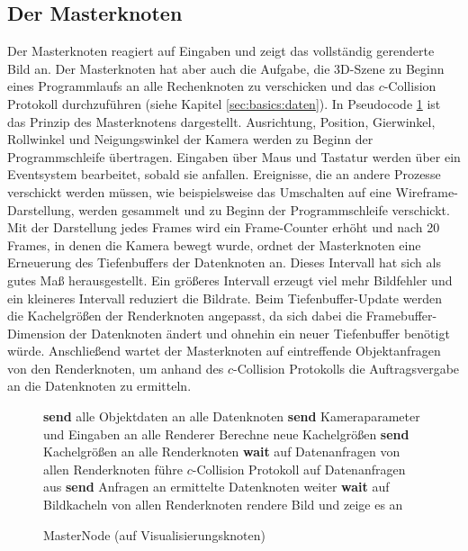 \subsection{Der Masterknoten}
\label{sec:impl:master}
Der Masterknoten reagiert auf Eingaben und zeigt das vollständig gerenderte Bild an. Der Masterknoten hat aber auch die Aufgabe, die 3D-Szene zu Beginn eines Programmlaufs an alle Rechenknoten zu verschicken und das $c$-Collision Protokoll durchzuführen (siehe Kapitel \ref{sec:basics:daten}). In Pseudocode \ref{alg:impl:masternode} ist das Prinzip des Masterknotens dargestellt. Ausrichtung, Position, Gierwinkel, Rollwinkel und Neigungswinkel der Kamera werden zu Beginn der Programmschleife übertragen. Eingaben über Maus und Tastatur werden über ein Eventsystem bearbeitet, sobald sie anfallen. Ereignisse, die an andere Prozesse verschickt werden müssen, wie beispielsweise das Umschalten auf eine Wireframe-Darstellung, werden gesammelt und zu Beginn der Programmschleife verschickt. Mit der Darstellung jedes Frames wird ein Frame-Counter erhöht und nach 20 Frames, in denen die Kamera bewegt wurde, ordnet der Masterknoten eine Erneuerung des Tiefenbuffers der Datenknoten an. Dieses Intervall hat sich als gutes Maß herausgestellt. Ein größeres Intervall erzeugt viel mehr Bildfehler und ein kleineres Intervall reduziert die Bildrate. Beim Tiefenbuffer-Update werden die Kachelgrößen der Renderknoten angepasst, da sich dabei die Framebuffer-Dimension der Datenknoten ändert und ohnehin ein neuer Tiefenbuffer benötigt würde. Anschließend wartet der Masterknoten auf eintreffende Objektanfragen von den Renderknoten, um anhand des $c$-Collision Protokolls die Auftragsvergabe an die Datenknoten zu ermitteln.
\begin{figure}[ttt!]
\centering
 \begin{minipage}[t]{12cm}
\begin{algorithm}[H]
  \caption{MasterNode (auf Visualisierungsknoten)\label{alg:impl:masternode}} 
    \begin{algorithmic} [1]
      \STATE \textbf{send} alle Objektdaten an alle Datenknoten
	\STATE \textbf{send} Kameraparameter und Eingaben an alle Renderer
	  \STATE Berechne neue Kachelgrößen
	  \STATE \textbf{send} Kachelgrößen an alle Renderknoten
	\ENDIF
	\STATE \textbf{wait} auf Datenanfragen von allen Renderknoten
	\STATE führe $c$-Collision Protokoll auf Datenanfragen aus
	\STATE \textbf{send} Anfragen an ermittelte Datenknoten weiter
	\STATE \textbf{wait} auf Bildkacheln von allen Renderknoten
	\STATE rendere Bild und zeige es an
      \ENDWHILE
    \end{algorithmic}
\end{algorithm}
 \end{minipage}
\end{figure}


